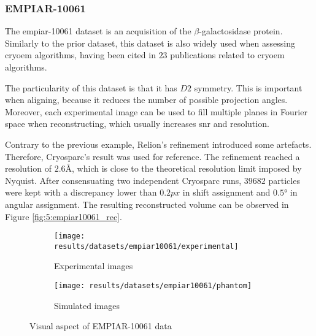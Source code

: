\documentclass[../main.tex]{subfiles}
\begin{document}
\subsubsection{EMPIAR-10061}
The \gls{empiar}-10061 dataset is an acquisition of the $\beta$-galactosidase protein\cite{bartesaghi2015}\cite{empiar10061}. Similarly to the prior dataset, this dataset is also widely used when assessing \gls{cryoem} algorithms, having been cited in $23$ publications related to \gls{cryoem} algorithms. 

The particularity of this dataset is that it has $D2$ symmetry. This is important when aligning, because it reduces the number of possible projection angles. Moreover, each experimental image can be used to fill multiple planes in Fourier space when reconstructing, which usually increases \gls{snr} and resolution.

Contrary to the previous example, Relion's refinement introduced some artefacts. Therefore, Cryosparc's result was used for reference. The refinement reached a resolution of $2.6 \si{\angstrom}$, which is close to the theoretical resolution limit imposed by Nyquist. After consensuating two independent Cryosparc runs, $39682$ particles were kept with a discrepancy lower than $0.2 \si{px}$ in shift assignment and $0.5 \si{\degree}$ in angular assignment. The resulting reconstructed volume can be observed in Figure \ref{fig:5:empiar10061_rec}.

\begin{figure}[htbp]
    \centering
    \begin{subfigure}[b]{0.45\textwidth}
         \centering
         \texttt{[image: results/datasets/empiar10061/experimental]}
         \caption{Experimental images}
    \end{subfigure}
    \hfill
    \begin{subfigure}[b]{0.45\textwidth}
         \centering
         \texttt{[image: results/datasets/empiar10061/phantom]}
         \caption{Simulated images}
    \end{subfigure}
    \caption{Visual aspect of EMPIAR-10061 data}
    \label{fig:5:empiar10061}
\end{figure}
\end{document}

